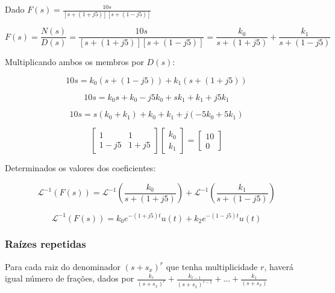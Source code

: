 \documentclass[12pt,fleqn]{book} %
\begin{document}
\begin{example}
Dado $F(s) = \frac{10s}{[s+(1+j5)][s+(1-j5)]}$

\begin{equation}
F(s) = \frac{N(s)}{D(s)} = \frac{10s}{[s+(1+j5)][s+(1-j5)]} = \frac{k_0}{s+(1+j5)} + \frac{k_1}{s+(1-j5)}
\end{equation}

Multiplicando ambos os membros por $D(s)$:

\begin{equation}
10s = k_0(s+(1-j5)) + k_1(s+(1+j5))
\end{equation}

\begin{equation}
10s = k_0s+k_0-j5k_0 + sk_1+k_1+j5k_1
\end{equation}

\begin{equation}
10s = s(k_0+k_1) + k_0 + k_1 + j(-5k_0+5k_1)
\end{equation}

\begin{equation}
\begin{bmatrix}
1&1\\
1-j5&1+j5
\end{bmatrix}
\begin{bmatrix}
k_0\\k_1
\end{bmatrix}
=
\begin{bmatrix}
10\\0
\end{bmatrix}
\end{equation}

Determinados os valores dos coeficientes:

\begin{equation}
\mathscr{L}^{-1}(F(s)) = \mathscr{L}^{-1}(\frac{k_0}{s+(1+j5)}) +\mathscr{L}^{-1}(\frac{k_1}{s+(1-j5)})  
\end{equation}

\begin{equation}
\mathscr{L}^{-1}(F(s)) = k_0e^{-(1+j5)t}u(t) + k_2e^{-(1-j5)t}u(t)
\end{equation}

\end{example}

\subsubsection{Raízes repetidas}
\begin{remark}
Para cada raiz do denominador $(s+s_x )^r$ que tenha multiplicidade $r$, haverá igual número de frações, dados por $\frac{k_r}{(s+s_x )^r} +\frac{k_{r-1}}{(s+s_x)^{r-1}} +...+\frac{k_1}{(s+s_x)}$
\end{remark}
\end{document}
